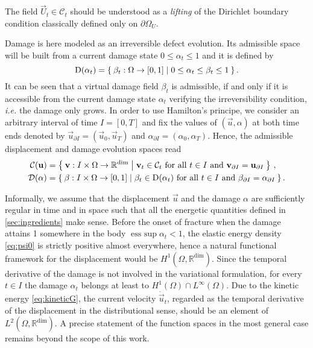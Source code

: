 \begin{remark}
The field $\vec{U}_t\in\mathcal{C}_t$ should be understood as a \emph{lifting} of the Dirichlet boundary condition classically defined only on $\partial\Omega_U$.
\end{remark}

Damage is here modeled as an irreversible defect evolution. Its admissible space will be built from a current damage state $0\leq\alpha_t\leq 1$ and it is defined by
\begin{equation} \label{eq:Dalphat}
\mathrm{D}(\alpha_t)=\Set{\beta_t:\Omega\to[0,1]|0\leq\alpha_t\leq\beta_t\leq 1}.
\end{equation}
It can be seen that a virtual damage field $\beta_t$ is admissible, if and only if it is accessible from the current damage state $\alpha_t$ verifying the irreversibility condition, \emph{i.e.} the damage only grows. In order to use Hamilton's principe, we consider an arbitrary interval of time $I=[0,T]$ and fix the values of $(\vec{u},\alpha)$ at both time ends denoted by $\vec{u}_{\partial I}=(\vec{u}_0,\vec{u}_T)$ and $\alpha_{\partial I}=(\alpha_0,\alpha_T)$. Hence, the admissible displacement and damage evolution spaces read
\begin{align}
\mathcal{C}(\vec{u}) &= \set{\vec{v}:I\times\Omega\to\mathbb{R}^\mathrm{dim}|\vec{v}_t\in\mathcal{C}_t\text{ for all $t\in I$ and }\vec{v}_{\partial I}=\vec{u}_{\partial I}}\,, \label{eq:Du} \\
\mathcal{D}(\alpha) &= \set{\beta:I\times\Omega\to[0,1]|\beta_t\in\mathrm{D}(\alpha_t)\text{ for all $t\in I$ and }\beta_{\partial I}=\alpha_{\partial I}}. \label{eq:Dalpha}
\end{align}

\begin{remark}
Informally, we assume that the displacement $\vec{u}$ and the damage $\alpha$ are sufficiently regular in time and in space such that all the energetic quantities defined in \cref{sec:ingredients} make sense. Before the onset of fracture when the damage attains 1 somewhere in the body $\operatorname{ess\ sup}\alpha_t< 1$, the elastic energy density \eqref{eq:psi0} is strictly positive almost everywhere, hence a natural functional framework for the displacement would be $H^1(\Omega,\mathbb{R}^\mathrm{dim})$. Since the temporal derivative of the damage is not involved in the variational formulation, for every $t\in I$ the damage $\alpha_t$ belongs at least to $H^1(\Omega)\cap L^\infty(\Omega)$. Due to the kinetic energy \eqref{eq:kineticG}, the current velocity $\dot{\vec{u}}_t$, regarded as the temporal derivative of the displacement in the distributional sense, should be an element of $L^2(\Omega,\mathbb{R}^\mathrm{dim})$. A precise statement of the function spaces in the most general case remains beyond the scope of this work.
\end{remark}

